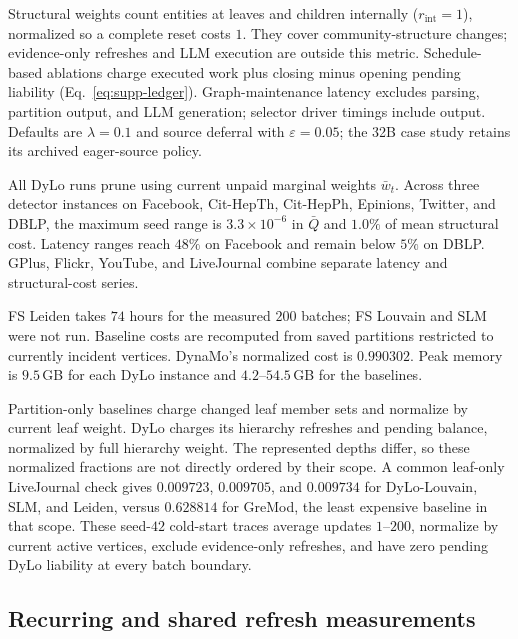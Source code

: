 Structural weights count entities at leaves and children internally
($r_{\mathrm{int}}=1$), normalized so a complete reset costs $1$.
They cover community-structure changes; evidence-only refreshes and LLM
execution are outside this metric. Schedule-based ablations charge executed
work plus closing minus opening pending liability
(Eq.~\ref{eq:supp-ledger}). Graph-maintenance latency excludes parsing,
partition output, and LLM generation; selector driver timings include output.
Defaults are $\lambda=0.1$ and source deferral with $\varepsilon=0.05$;
the 32B case study retains its archived eager-source policy.

All DyLo runs prune using current unpaid marginal weights $\bar w_t$.
Across three detector instances on Facebook, Cit-HepTh, Cit-HepPh,
Epinions, Twitter, and DBLP, the maximum seed range is
$3.3\times10^{-6}$ in $\bar Q$ and $1.0\%$ of mean structural cost.
Latency ranges reach $48\%$ on Facebook and remain below $5\%$ on DBLP.
GPlus, Flickr, YouTube, and LiveJournal combine separate latency and
structural-cost series.

 FS Leiden takes $74$ hours for the measured
$200$ batches; FS Louvain and SLM were not run. Baseline costs are recomputed
from saved partitions restricted to currently incident vertices.
DynaMo's normalized cost is $0.990302$. Peak memory is $9.5$\,GB for each
DyLo instance and $4.2$--$54.5$\,GB for the baselines.

 Partition-only baselines charge changed
leaf member sets and normalize by current leaf weight. DyLo charges its
hierarchy refreshes and pending balance, normalized by full hierarchy weight.
The represented depths differ, so these normalized fractions are not directly
ordered by their scope. A common leaf-only LiveJournal check gives
$0.009723$, $0.009705$, and $0.009734$ for DyLo-Louvain, SLM, and Leiden,
versus $0.628814$ for GreMod, the least expensive baseline in that scope.
These seed-$42$ cold-start traces average updates $1$--$200$, normalize by
current active vertices, exclude evidence-only refreshes, and have zero
pending DyLo liability at every batch boundary.

\subsection{Recurring and shared refresh measurements}\label{app:motivation}

